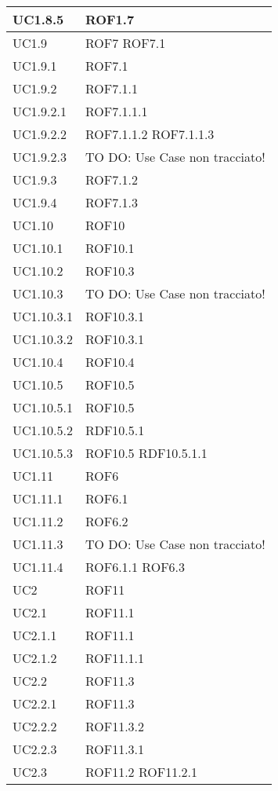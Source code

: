 \begin{center}
\begin{longtable}{| p{4cm} | p{4cm} |}
UC1.8.5 & ROF1.7 \\
\hline
UC1.9 & ROF7 \newline ROF7.1 \\
\hline
UC1.9.1 & ROF7.1 \\
\hline
UC1.9.2 & ROF7.1.1 \\
\hline
UC1.9.2.1 & ROF7.1.1.1 \\
\hline
UC1.9.2.2 & ROF7.1.1.2 \newline ROF7.1.1.3 \\
\hline
UC1.9.2.3 & TO DO: Use Case non tracciato! \\
\hline
UC1.9.3 & ROF7.1.2 \\
\hline
UC1.9.4 & ROF7.1.3 \\
\hline
UC1.10 & ROF10 \\
\hline
UC1.10.1 & ROF10.1 \\
\hline
UC1.10.2 & ROF10.3 \\
\hline
UC1.10.3 & TO DO: Use Case non tracciato! \\
\hline
UC1.10.3.1 & ROF10.3.1 \\
\hline
UC1.10.3.2 & ROF10.3.1 \\
\hline
UC1.10.4 & ROF10.4 \\
\hline
UC1.10.5 & ROF10.5 \\
\hline
UC1.10.5.1 & ROF10.5 \\
\hline
UC1.10.5.2 & RDF10.5.1 \\
\hline
UC1.10.5.3 & ROF10.5 \newline RDF10.5.1.1 \\
\hline
UC1.11 & ROF6 \\
\hline
UC1.11.1 & ROF6.1 \\
\hline
UC1.11.2 & ROF6.2 \\
\hline
UC1.11.3 & TO DO: Use Case non tracciato! \\
\hline
UC1.11.4 & ROF6.1.1 \newline ROF6.3 \\
\hline
UC2 & ROF11 \\
\hline
UC2.1 & ROF11.1 \\
\hline
UC2.1.1 & ROF11.1 \\
\hline
UC2.1.2 & ROF11.1.1 \\
\hline
UC2.2 & ROF11.3 \\
\hline
UC2.2.1 & ROF11.3 \\
\hline
UC2.2.2 & ROF11.3.2 \\
\hline
UC2.2.3 & ROF11.3.1 \\
\hline
UC2.3 & ROF11.2 \newline ROF11.2.1 \\

\end{longtable}
\end{center}
